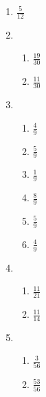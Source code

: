 {\begin{multicols}{3}
\begin{enumerate}[noitemsep, label=\textbf{\arabic*}. ]
      \item %
$\frac{5}{12}$%
	

      \item %
	    \begin{enumerate}[itemsep=1pt, label=\textbf{(\alph*)} ]
		\item $\frac{19}{30}$%
		\item $\frac{11}{30}$%
	    \end{enumerate}

      \item %
	    \begin{enumerate}[itemsep=1pt, label=\textbf{(\alph*)} ]
		\item $\frac{4}{9}$%
		\item $\frac{5}{9}$%
		\item $\frac{1}{9}$%
		\item $\frac{8}{9}$%
		\item $\frac{5}{9}$%
		\item $\frac{4}{9}$%
	    \end{enumerate}

      \item %
	    \begin{enumerate}[itemsep=1pt, label=\textbf{(\alph*)} ]
		\item $\frac{11}{21}$%
		\item $\frac{11}{14}$%
	    \end{enumerate}

      \item %
	    \begin{enumerate}[itemsep=1pt, label=\textbf{(\alph*)} ]
		\item$\frac{3}{56}$%
		\item $\frac{53}{56}$%
	    \end{enumerate}


\end{enumerate}
\end{multicols}}

